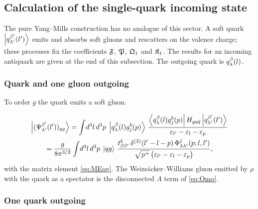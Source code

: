 \subsection{Calculation of the single-quark incoming state}
\label{sec:wf-q}

The pure Yang--Mills construction has no analogue of this sector. A soft quark
$\left|q^{\beta'}_{\lambda'}(l')\right\rangle$ emits and absorbs soft gluons and rescatters on the valence
charge; these processes fix the coefficients $\mathfrak{F}$, $\mathfrak{P}$, $\mathfrak{Q}_{1}$ and $\mathfrak{K}_{1}$. The
results for an incoming antiquark are given at the end of this subsection. The outgoing quark is
$q^{\beta}_{\lambda}(l)$.

\subsubsection{Quark and one gluon outgoing}

To order $g$ the quark emits a soft gluon.
\begin{center}
\end{center}
\begin{multline}
\left|(\Psi^{\beta'}_{\lambda'}(l'))_{qg}\right\rangle=\int\!d^{3}l\,d^{3}p\;\left|q^{\beta}_{\lambda}(l)g^{b}_{j}(p)\right\rangle\,
\frac{\left\langle q^{\beta}_{\lambda}(l)g^{b}_{j}(p)\right|H_{gq\bar q}\left|q^{\beta'}_{\lambda'}(l')\right\rangle}{\varepsilon_{l'}-\varepsilon_{l}-\varepsilon_{p}}\\
=\frac{g}{8\pi^{3/2}}\int\!d^{3}l\,d^{3}p\;\left|qg\right\rangle\,
\frac{t^{b}_{\beta\beta'}\,\delta^{(3)}(l'-l-p)\,\Phi^{j}_{\lambda\lambda'}(p;l,l')}{\sqrt{p^{+}}\,\big(\varepsilon_{l'}-\varepsilon_{l}-\varepsilon_{p}\big)} ,
\label{eq:Pq-qg}
\end{multline}
with the matrix element \eqref{eq:MEqg}. The Weizs\"acker--Williams gluon emitted by $\rho$ with
the quark as a spectator is the disconnected $A$ term of \eqref{eq:Omq}.

\subsubsection{One quark outgoing}

